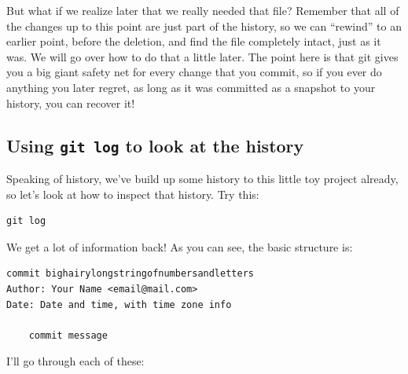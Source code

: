 \documentclass{article}
\begin{document}
But what if we realize later that we really needed that file?  Remember that all of the changes up to this point are just part of the history, so we can ``rewind'' to an earlier point, before the deletion, and find the file completely intact, just as it was.  We will go over how to do that a little later.  The point here is that git gives you a big giant safety net for every change that you commit, so if you ever do anything you later regret, as long as it was committed as a snapshot to your history, you can recover it!
\subsection{Using \texttt{git log} to look at the history}
\label{sec-5-5}

Speaking of history, we've build up some history to this little toy project already, so let's look at how to inspect that history.  Try this:


\begin{verbatim}
git log
\end{verbatim}

We get a lot of information back!  As you can see, the basic structure is:


\begin{verbatim}
commit bighairylongstringofnumbersandletters
Author: Your Name <email@mail.com>
Date: Date and time, with time zone info

    commit message
\end{verbatim}

I'll go through each of these:
\end{document}
